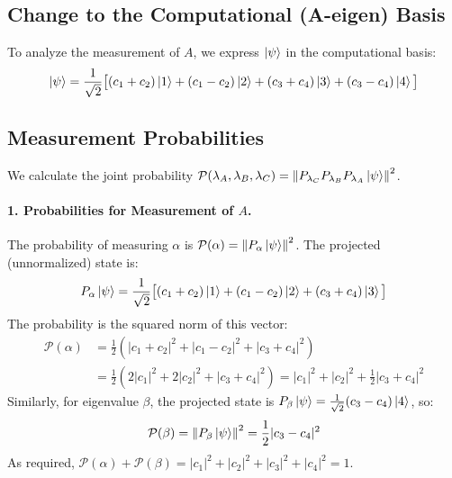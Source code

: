 \documentclass[11pt,a4paper]{article}
\begin{document}
\subsection{Change to the Computational (A-eigen) Basis}
To analyze the measurement of $A$, we express $\ket{\psi}$ in the computational
basis:
$$
\ket{\psi} = \frac{1}{\sqrt{2}} \big[ (c_1+c_2)\ket{1} + (c_1-c_2)\ket{2} +
(c_3+c_4)\ket{3} + (c_3-c_4)\ket{4} \big]
$$

\subsection{Measurement Probabilities}
We calculate the joint probability $\mathcal{P}(\lambda_A, \lambda_B, \lambda_C)
= \norm{P_{\lambda_C} P_{\lambda_B} P_{\lambda_A} \ket{\psi}}^2$.

\paragraph{1. Probabilities for Measurement of $A$.}
The probability of measuring $\alpha$ is $\mathcal{P}(\alpha) = \norm{P_\alpha
\ket{\psi}}^2$. The projected (unnormalized) state is:
$$ P_\alpha \ket{\psi} = \frac{1}{\sqrt{2}} \big[ (c_1+c_2)\ket{1} +
(c_1-c_2)\ket{2} + (c_3+c_4)\ket{3} \big] $$
The probability is the squared norm of this vector:
\begin{align*}
  \mathcal{P}(\alpha) &= \frac{1}{2} \left( |c_1+c_2|^2 + |c_1-c_2|^2 +
  |c_3+c_4|^2 \right) \\
                      &= \frac{1}{2} \left( 2|c_1|^2 + 2|c_2|^2 + |c_3+c_4|^2
                      \right) = |c_1|^2 + |c_2|^2 + \frac{1}{2}|c_3+c_4|^2
  \end{align*}
  Similarly, for eigenvalue $\beta$, the projected state is $P_\beta \ket{\psi} =
  \frac{1}{\sqrt{2}}(c_3-c_4)\ket{4}$, so:
  $$ \mathcal{P}(\beta) = \norm{P_\beta \ket{\psi}}^2 = \frac{1}{2}|c_3-c_4|^2 $$
  As required, $\mathcal{P}(\alpha) + \mathcal{P}(\beta) =
  |c_1|^2+|c_2|^2+|c_3|^2+|c_4|^2 = 1$.
\end{document}
